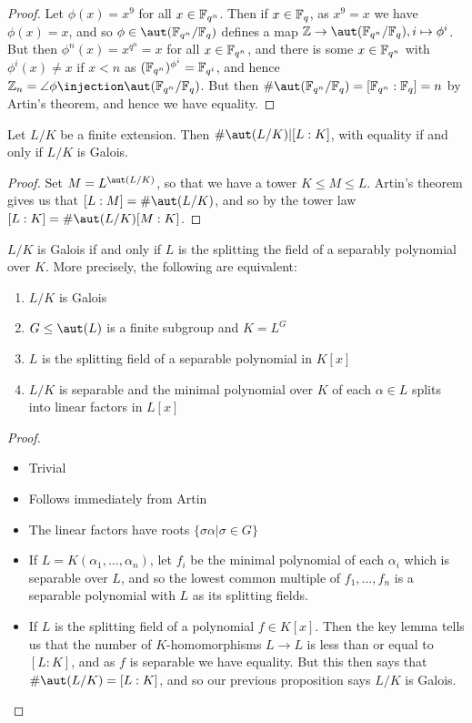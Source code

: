 \documentclass[a4paper, 10pt, twocolumn]{amsart}
\begin{document}
\begin{proof}
Let $\phi(x) = x^9$ for all $x \in \mathbb{F}_{q^n}$. Then if $x \in \mathbb{F}_q$, as $x^9 = x$ we have $\phi(x) = x$, and so $\phi \in \aut(\F_{q^n}/\F_q)$ defines a map $\Z \to \aut(\F_{q^n}/\F_q), i \mapsto \phi^i$. But then $\phi^n(x) = x^{q^n} = x$ for all $x \in \mathbb{F}_{q^n}$, and there is some $x \in \mathbb{F}_{q^n}$ with $\phi^i(x) \neq x$ if $x < n$ as $(\mathbb{F}_{q^n})^{\phi^i} = \mathbb{F}_{q^i}$, and hence $\Z_n = \angle{\phi} \injection \aut(\F_{q^n}/\F_q)$. But then $\#\aut(\F_{q^n}/\F_q) = [\F_{q^n} : \F_q] = n$ by Artin's theorem, and hence we have equality.
\end{proof}

\begin{proposition}
Let $L/K$ be a finite extension. Then $\#\aut(L/K) | [L:K]$, with equality if and only if $L/K$ is Galois.
\end{proposition}
\begin{proof}
Set $M = L^{\aut(L/K)}$, so that we have a tower $K \leq M \leq L$. Artin's theorem gives us that $[L:M] = \#\aut(L/K)$, and so by the tower law $[L:K] = \#\aut(L/K)[M:K]$.
\end{proof}
\begin{theorem}
$L/K$ is Galois if and only if $L$ is the splitting the field of a separably polynomial over $K$. More precisely, the following are equivalent:
\begin{enumerate}
\item $L/K$ is Galois
\item $G \leq \aut(L)$ is a finite subgroup and $K = L^G$
\item $L$ is the splitting field of a separable polynomial in $K[x]$
\item $L/K$ is separable and the minimal polynomial over $K$ of each $\alpha \in L$ splits into linear factors in $L[x]$
\end{enumerate}
\end{theorem}
\begin{proof}\item
\begin{itemize}
\item[\imp{1}{2}] Trivial
\item[\imp{2}{1}] Follows immediately from Artin
\item[\imp{2}{4}] The linear factors have roots $\{\sigma\alpha | \sigma \in G\}$
\item[\imp{4}{3}] If $L=K(\alpha_1, \ldots, \alpha_n)$, let $f_i$ be the minimal polynomial of each $\alpha_i$ which is separable over $L$, and so the lowest common multiple of $f_1, \ldots, f_n$ is a separable polynomial with $L$ as its splitting fields.
\item[\imp{3}{1}] If $L$ is the splitting field of a polynomial $f \in K[x]$. Then the key lemma tells us that the number of $K$-homomorphisms $L \to L$ is less than or equal to $[L:K]$, and as $f$ is separable we have equality. But this then says that $\#\aut(L/K)=[L:K]$, and so our previous proposition says $L/K$ is Galois.
\end{itemize}
\end{proof}
\end{document}
